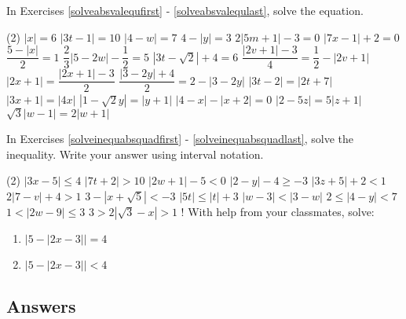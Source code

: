 \label{ExercisesforAppAbsValEqIneq}

In Exercises \ref{solveabsvalequfirst} - \ref{solveabsvalequlast}, solve the equation.

\begin{tasks}(2)
\task  $|x| = 6$ \label{solveabsvalequfirst} 
\task $|3t-1| = 10$
\task $|4-w| = 7$
\task  $4 - |y| = 3$
\task $2|5m+1| - 3 = 0$
\task $|7x-1| + 2 = 0$
\task $\dfrac{5 - |x|}{2} = 1$ 
\task $\dfrac{2}{3} |5-2w| - \dfrac{1}{2} = 5$ 
\task $|3t - \sqrt{2}| + 4 = 6$ 
\task $\dfrac{|2v+1| - 3}{4} = \dfrac{1}{2} - |2v+1|$
\task $|2x+1| = \dfrac{|2x+1| - 3}{2}$
\task $\dfrac{|3-2y|+ 4}{2} = 2 - |3-2y|$
\task $|3t - 2| = |2t + 7|$  
\task $|3x+1| = |4x|$
\task $|1-\sqrt{2} y| = |y+1|$
\task  $|4-x| - |x+2| = 0$
\task $|2-5z| = 5 |z+1|$
\task $\sqrt{3}|w-1| = 2|w+1|$ \label{solveabsvalequlast}
\end{tasks}


In Exercises \ref{solveinequabsquadfirst} - \ref{solveinequabsquadlast}, solve the inequality.  Write your answer using interval notation. 

\begin{tasks}[resume](2)
\task $|3x - 5| \leq 4$ \label{solveinequabsquadfirst}
\task $|7t + 2| > 10$
\task $|2w+1| - 5 < 0$   
\task $|2-y| - 4 \geq -3$
\task $|3z+5| + 2 < 1$   
\task $2|7-v| +4 > 1$
\task $3 - |x+\sqrt{5}| < -3$
\task $|5t| \leq |t|+3$   
\task $|w-3| < |3-w|$
\task  $2 \leq |4-y| < 7$ 
\task $1 < |2w - 9| \leq 3$ 
\task  $3 > 2|\sqrt{3} - x| > 1$ \label{solveinequabsquadlast}
\task!  With help from your classmates, solve:

\begin{enumerate}[label=(\alph*)]
\item  $|5 - |2x-3|| = 4$
\item   $|5 - |2x-3|| < 4$
\end{enumerate}

\end{tasks}


\newpage

\subsection{Answers}

